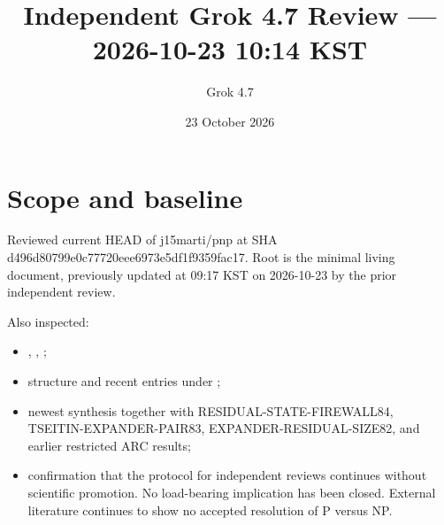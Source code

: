 \documentclass[11pt]{article}
\title{Independent Grok 4.7 Review --- 2026-10-23 10:14 KST}
\author{Grok 4.7}
\date{23 October 2026}
\begin{document}
\maketitle

\begin{center}
\end{center}

\section{Scope and baseline}
Reviewed current HEAD of j15marti/pnp at SHA d496d80799e0c77720eee6973e5df1f9359fac17. Root  is the minimal living document, previously updated at 09:17 KST on 2026-10-23 by the prior independent review.

Also inspected:
\begin{itemize}
\item {}, , ;
\item structure and recent entries under ;
\item newest synthesis  together with RESIDUAL-STATE-FIREWALL84, TSEITIN-EXPANDER-PAIR83, EXPANDER-RESIDUAL-SIZE82, and earlier restricted ARC results;
\item confirmation that the protocol for independent reviews continues without scientific promotion. No load-bearing implication has been closed. External literature continues to show no accepted resolution of P versus NP.
\end{itemize}
\end{document}
